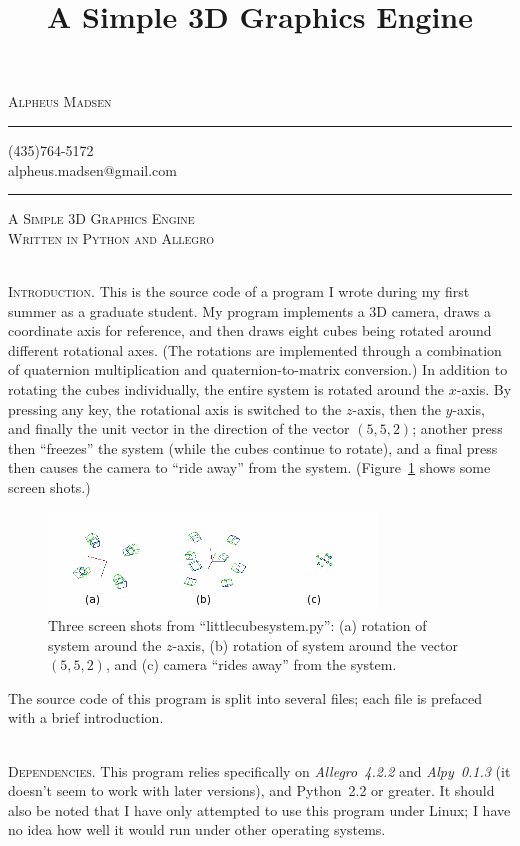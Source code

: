 \documentclass[12pt]{article}
\title{A Simple 3D Graphics Engine}
\author{\headerstuff}
\date{}
\makeatletter
\newcommand{\titleize}[1]{
   \begin{center}
       \Large \textsc{#1} \normalsize \\
   \end{center}
}
\newcommand{\normaltitleize}[1]{\mbox{}\\ \textsc{#1} \normalsize}
\newcommand{\headerstuff}{
   \begin{center}
   \textsc{\Large{Alpheus Madsen}}

   \rule{1in}{.01in}

   (435)764-5172 \\

   alpheus.madsen@gmail.com

   \rule{2in}{.01in}
   \end{center}
}
\makeatother
\begin{document}

\headerstuff

\titleize{A Simple 3D Graphics Engine\\Written in Python and Allegro}

\normaltitleize{Introduction.}  This is the source code of a program I wrote during my first summer as a graduate student.  My program implements a 3D camera, draws a coordinate axis for reference, and then draws eight cubes being rotated around different rotational axes.  (The rotations are implemented through a combination of quaternion multiplication and quaternion-to-matrix conversion.)  In addition to rotating the cubes individually, the entire system is rotated around the $x$-axis.  By pressing any key, the rotational axis is switched to the $z$-axis, then the $y$-axis, and finally the unit vector in the direction of the vector $(5, 5, 2)$; another press then ``freezes'' the system (while the cubes continue to rotate), and a final press then causes the camera to ``ride away'' from the system.  (Figure~\ref{screenshots} shows some screen shots.)

\begin{figure}[!hbtp]
   \includegraphics{screenshots4.png}
\caption{Three screen shots from ``littlecubesystem.py'': (a) rotation of system around the $z$-axis, (b) rotation of system around the vector $(5, 5, 2)$, and (c) camera ``rides away'' from the system.}\label{screenshots}
\end{figure}

The source code of this program is split into several files; each file is prefaced with a brief introduction.

\normaltitleize{Dependencies.}  This program relies specifically on \emph{Allegro~4.2.2} and \emph{Alpy~0.1.3} (it doesn't seem to work with later versions), and Python~2.2 or greater.  It should also be noted that I have only attempted to use this program under Linux; I have no idea how well it would run under other operating systems.
\end{document}
